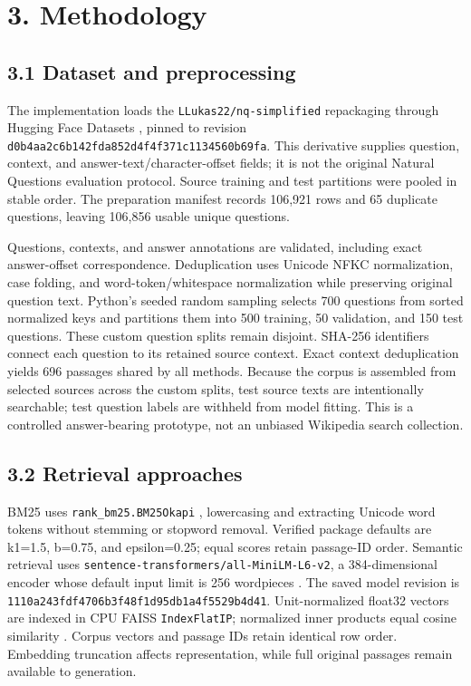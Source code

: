 \documentclass[
  11pt,
]{article}
\begin{document}
\hypertarget{methodology}{%
\section{3. Methodology}\label{methodology}}

\hypertarget{dataset-and-preprocessing}{%
\subsection{3.1 Dataset and
preprocessing}\label{dataset-and-preprocessing}}

The implementation loads the \texttt{LLukas22/nq-simplified} repackaging
through Hugging Face Datasets \citep{nq_mirror, datasets}, pinned to
revision \texttt{d0b4aa2c6b142fda852d4f4f371c1134560b69fa}. This
derivative supplies question, context, and answer-text/character-offset
fields; it is not the original Natural Questions evaluation protocol.
Source training and test partitions were pooled in stable order. The
preparation manifest records 106,921 rows and 65 duplicate questions,
leaving 106,856 usable unique questions.

Questions, contexts, and answer annotations are validated, including
exact answer-offset correspondence. Deduplication uses Unicode NFKC
normalization, case folding, and word-token/whitespace normalization
while preserving original question text. Python's seeded random sampling
selects 700 questions from sorted normalized keys and partitions them
into 500 training, 50 validation, and 150 test questions. These custom
question splits remain disjoint. SHA-256 identifiers connect each
question to its retained source context. Exact context deduplication
yields 696 passages shared by all methods. Because the corpus is
assembled from selected sources across the custom splits, test source
texts are intentionally searchable; test question labels are withheld
from model fitting. This is a controlled answer-bearing prototype, not
an unbiased Wikipedia search collection.

\hypertarget{retrieval-approaches}{%
\subsection{3.2 Retrieval approaches}\label{retrieval-approaches}}

BM25 uses \texttt{rank\_bm25.BM25Okapi} \citep{rank_bm25}, lowercasing
and extracting Unicode word tokens without stemming or stopword removal.
Verified package defaults are k1=1.5, b=0.75, and epsilon=0.25; equal
scores retain passage-ID order. Semantic retrieval uses
\texttt{sentence-transformers/all-MiniLM-L6-v2}, a 384-dimensional
encoder whose default input limit is 256 wordpieces \citep{minilm_card}.
The saved model revision is
\texttt{1110a243fdf4706b3f48f1d95db1a4f5529b4d41}. Unit-normalized
float32 vectors are indexed in CPU FAISS \texttt{IndexFlatIP};
normalized inner products equal cosine similarity
\citep{faiss_paper, faiss_metrics}. Corpus vectors and passage IDs
retain identical row order. Embedding truncation affects representation,
while full original passages remain available to generation.
\end{document}
